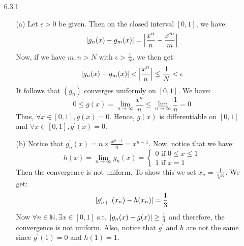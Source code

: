\documentclass[11pt]{article}
\DeclarePairedDelimiter\abs{\lvert}{\rvert}%
\DeclarePairedDelimiter\absb{\Big\lvert}{\Big\rvert}%
\newcommand{\nats}{\mathbb{N}}
\begin{document}
\begin{itemize}
    \item[6.3.1]
        \begin{itemize}
            \item[(a)]
                Let $\epsilon > 0$ be given. Then on the closed interval $[0,
                1]$, we have:
                \begin{equation*}
                    \abs{g_n(x) - g_m(x)} = \absb{\frac{x^n}{n} - \frac{x^m}{m}}
                \end{equation*}
                Now, if we have $m, n > N$ with $\epsilon > \frac{1}{N}$, we
                then get:
                \begin{equation*}
                    \abs{g_n(x) - g_m(x)} < \absb{\frac{x^n}{n}}
                        \leq \frac{1}{N} < \epsilon
                \end{equation*}
                It follows that $(g_n)$ converges uniformly on $[0, 1]$.
                We have:
                \begin{equation*}
                    0 \leq g(x) = \lim_{n \to \infty}{\frac{x^n}{n}}
                        \leq \lim_{n \to \infty}{\frac{1}{n}} = 0
                \end{equation*}
                Thus, $\forall x \in [0, 1], g(x) = 0$. Hence, $g(x)$ is
                differentiable on $[0, 1]$ and $\forall x \in [0, 1],
                g^\prime(x) = 0$.

            \item[(b)]
                Notice that $g^\prime_n(x) = n \times \frac{x^{n - 1}}{n} =
                x^{n - 1}$. Now, notice that we have:
                \begin{equation*}
                    h(x) = \lim_{n \to \infty}g_n(x) =
                    \begin{cases}
                        0 \text{ if } 0 \leq x \leq 1\\
                        1 \text{ if } x = 1
                    \end{cases}
                \end{equation*}
                Then the convergence is not uniform. To show this we set $x_n =
                \frac{1}{\sqrt[n]{3}}$. We get:
                \begin{equation*}
                    \abs{g^\prime_{n + 1}(x_n) - h(x_n)} = \frac{1}{3}
                \end{equation*}
                Now $\forall n \in \nats, \exists x \in [0, 1]$ s.t.
                $\abs{g_n(x) - g(x)} \geq \frac{1}{3}$ and therefore, the
                convergence is not uniform. Also, notice that $g^\prime$ and
                $h$ are not the same since $g^\prime(1) = 0$ and $h(1) = 1$.
        \end{itemize}


\end{itemize}
\end{document}
